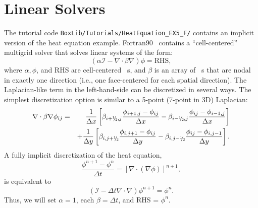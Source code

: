 \section{Linear Solvers}\label{Sec:Linear Solvers}
The tutorial code {\tt BoxLib/Tutorials/HeatEquation\_EX5\_F/}
contains an implicit version of the heat equation example.  Fortran90
\BoxLib\ contains a ``cell-centered'' multigrid solver that solves
linear systems of the form:
\begin{equation}
(\alpha\mathcal{I} - \nabla\cdot\beta\nabla)\phi = \text{RHS},
\end{equation}
where $\alpha, \phi$, and RHS are cell-centered \MultiFab~s, and
$\beta$ is an array of \MultiFab~s that are nodal in exactly one
direction (i.e., one face-centered \MultiFab for each spatial
direction).  The Laplacian-like term in the left-hand-side can be
discretized in several ways.  The simplest discretization option is
similar to a 5-point (7-point in 3D) Laplacian:
\begin{eqnarray}
\nabla\cdot\beta\nabla\phi_{ij} &=&
\frac{1}{\Delta x} \left[\beta_{i+\myhalf,j}\frac{\phi_{i+1,j} - \phi_{ij}}{\Delta x} - \beta_{i-\myhalf,j}\frac{\phi_{ij} - \phi_{i-1,j}}{\Delta x}\right]\nonumber\\
&&+ \frac{1}{\Delta y} \left[\beta_{i,j+\myhalf}\frac{\phi_{i,j+1} - \phi_{ij}}{\Delta y} - \beta_{i,j-\myhalf}\frac{\phi_{ij} - \phi_{i,j-1}}{\Delta y}\right].
\end{eqnarray}
A fully implicit discretization of the heat equation,
\begin{equation}
\frac{\phi^{n+1} - \phi^n}{\Delta t} = \left[\nabla\cdot(\nabla\phi)\right]^{n+1},
\end{equation}
is equivalent to
\begin{equation}
(\mathcal{I} - \Delta t\nabla\cdot\nabla)\phi^{n+1} = \phi^n.
\end{equation}
Thus, we will set $\alpha=1$, each $\beta=\Delta t$, and RHS = $\phi^n$.

